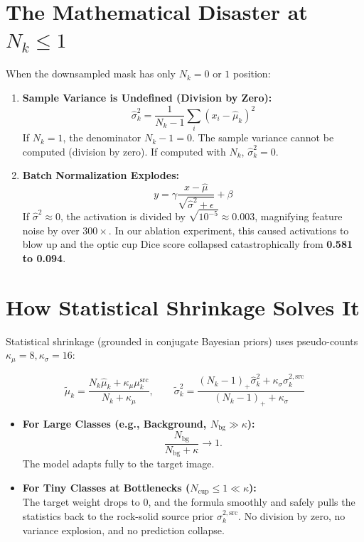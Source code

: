 \documentclass[11pt,a4paper]{article}
\begin{document}
\section{The Mathematical Disaster at $N_k \le 1$}

When the downsampled mask has only $N_k = 0$ or $1$ position:

\begin{enumerate}
    \item \textbf{Sample Variance is Undefined (Division by Zero):}
    \begin{equation}
        \hat{\sigma}^2_k = \frac{1}{N_k - 1} \sum_{i} (x_i - \hat{\mu}_k)^2
    \end{equation}
    If $N_k = 1$, the denominator $N_k - 1 = 0$. The sample variance cannot be computed (division by zero). If computed with $N_k$, $\hat{\sigma}^2_k = 0$.
    
    \item \textbf{Batch Normalization Explodes:}
    \begin{equation}
        y = \gamma \frac{x - \hat{\mu}}{\sqrt{\hat{\sigma}^2 + \epsilon}} + \beta
    \end{equation}
    If $\hat{\sigma}^2 \approx 0$, the activation is divided by $\sqrt{10^{-5}} \approx 0.003$, magnifying feature noise by over \textbf{$300\times$}. In our ablation experiment, this caused activations to blow up and the optic cup Dice score collapsed catastrophically from \textbf{0.581 to 0.094}.
\end{enumerate}

\section{How Statistical Shrinkage Solves It}

Statistical shrinkage (grounded in conjugate Bayesian priors) uses pseudo-counts $\kappa_\mu = 8, \kappa_\sigma = 16$:

\begin{equation}
    \tilde{\mu}_k = \frac{N_k \hat{\mu}_k + \kappa_\mu \mu_k^{\mathrm{src}}}{N_k + \kappa_\mu}, \qquad 
    \tilde{\sigma}^2_k = \frac{(N_k - 1)_+ \hat{\sigma}^2_k + \kappa_\sigma \sigma_k^{2,\mathrm{src}}}{(N_k - 1)_+ + \kappa_\sigma}
\end{equation}

\begin{itemize}
    \item \textbf{For Large Classes (e.g., Background, $N_{\mathrm{bg}} \gg \kappa$):}
    \begin{equation}
        \frac{N_{\mathrm{bg}}}{N_{\mathrm{bg}} + \kappa} \to 1.
    \end{equation}
    The model adapts fully to the target image.
    
    \item \textbf{For Tiny Classes at Bottlenecks ($N_{\mathrm{cup}} \le 1 \ll \kappa$):}\\
    The target weight drops to $0$, and the formula smoothly and safely pulls the statistics back to the rock-solid source prior $\sigma_k^{2,\mathrm{src}}$. No division by zero, no variance explosion, and no prediction collapse.
\end{itemize}
\end{document}
